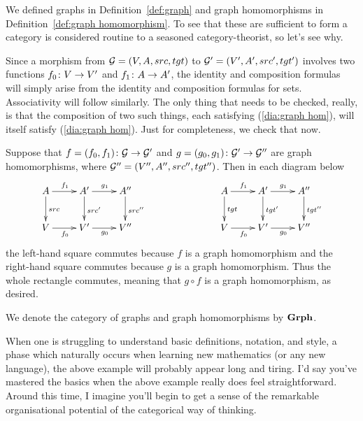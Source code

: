 \documentclass[CT4S-EN-RU]{subfiles}
\begin{document}
\begin{exampleENG}
We defined graphs in Definition~\ref{def:graph} and graph homomorphisms in Definition~\ref{def:graph homomorphism}. To see that these are sufficient to form a category is considered routine to a seasoned category-theorist, so let's see why. 

Since a morphism from $\mathcal{G}=(V,A,src,tgt)$ to $\mathcal{G}'=(V',A',src',tgt')$ involves two functions $f_0\colon V\rightarrow V'$ and $f_1\colon A\rightarrow A'$, the identity and composition formulas will simply arise from the identity and composition formulas for sets. Associativity will follow similarly. The only thing that needs to be checked, really, is that the composition of two such things, each satisfying (\ref{dia:graph hom}), will itself satisfy (\ref{dia:graph hom}). Just for completeness, we check that now.

Suppose that $f=(f_0,f_1)\colon\mathcal{G}\rightarrow\mathcal{G}'$ and $g=(g_0,g_1)\colon\mathcal{G}'\rightarrow\mathcal{G}''$ are graph homomorphisms, where $\mathcal{G}''=(V'',A'',src'',tgt'')$. Then in each diagram below
\begin{align}\label{dia:graph hom comp}
\xymatrix{A\ar[r]^{f_1}\ar[d]^{src}&A'\ar[r]^{g_1}\ar[d]^{src'}&A''\ar[d]^{src''}\\V\ar[r]_{f_0}&V'\ar[r]_{g_0}&V''
}\hspace{1in}
\xymatrix{A\ar[r]^{f_1}\ar[d]^{tgt}&A'\ar[d]^{tgt'}\ar[r]^{g_1}&A''\ar[d]^{tgt''}\\V\ar[r]_{f_0}&V'\ar[r]_{g_0}&V''
}
\end{align}
the left-hand square commutes because $f$ is a graph homomorphism and the right-hand square commutes because $g$ is a graph homomorphism. Thus the whole rectangle commutes, meaning that $g\circ f$ is a graph homomorphism, as desired. 

We denote the category of graphs and graph homomorphisms by ${\mathbf{Grph}}$.
\end{exampleENG}

\begin{exampleRUS}
\end{exampleRUS}

\begin{remarkENG}
When one is struggling to understand basic definitions, notation, and style, a phase which naturally occurs when learning new mathematics (or any new language), the above example will probably appear long and tiring. I'd say you've mastered the basics when the above example really does feel straightforward. Around this time, I imagine you'll begin to get a sense of the remarkable organisational potential of the categorical way of thinking.
\end{remarkENG} 
\end{document}

